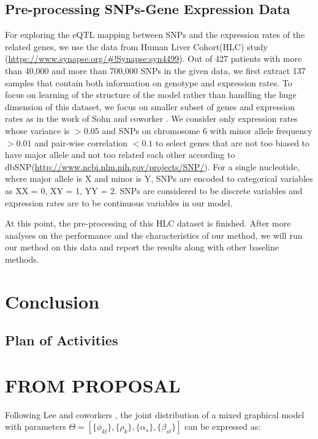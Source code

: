 \documentclass{article}
\begin{document}
\subsection{Pre-processing SNPs-Gene Expression Data}
For exploring the eQTL mapping between SNPs and the expression rates of the related genes, we use the data from Human Liver Cohort(HLC) study \cite{schadt2008mapping} (\url{https://www.synapse.org/#!Synapse:syn4499}). Out of 427 patients with more than 40,000 and more than 700,000 SNPs in the given data, we first extract 137 samples that contain both information on genotype and expression rates. To  focus on learning of the structure of the model rather than handling the huge dimension of this dataset, we focus on smaller subset of genes and expression rates as in the work of Sohn and coworker \cite{sohn2012joint}. We consider only expression rates whose variance is $ > 0.05$ and SNPs on chromosome 6 with minor allele frequency $ > 0.01$ and pair-wise correlation $ < 0.1$ to select genes that are not too biased to have major allele and not too related each other according to dbSNP(\url{http://www.ncbi.nlm.nih.gov/projects/SNP/}). For a single nucleotide, where major allele is X and minor is Y, SNPs are encoded to categorical variables as XX = 0, XY = 1, YY = 2. SNPs are considered to be discrete variables and expression rates are to be continuous variables in our model.
 
At this point, the pre-processing of this HLC dataset is finished. After more analyses on the performance and the characteristics of our method, we will run our method on this data and report the results along with other baseline methods.

\section{Conclusion}

\subsection{Plan of Activities}



\section{FROM PROPOSAL}

Following Lee and coworkers \cite{lee2013structure}, the joint distribution of a mixed graphical model with parameters $\Theta = [\{\phi_{kl}\}, \{\rho_{k}\}, \{\alpha_{s}\}, \{\beta_{st}\}]$ can be expressed as:
\end{document}
